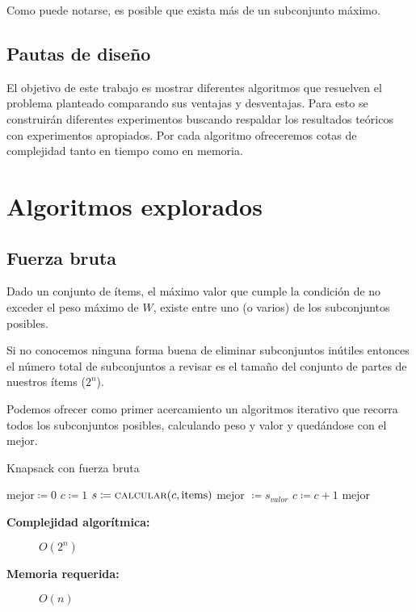 \documentclass[fleqn, 11pt]{article}
\def\is{\coloneqq}
\begin{document}
Como puede notarse, es posible que exista más de un subconjunto máximo.

\subsection{Pautas de diseño}

El objetivo de este trabajo es mostrar diferentes algoritmos que resuelven el
problema planteado comparando sus ventajas y desventajas. Para esto se
construirán diferentes experimentos buscando respaldar los resultados teóricos
con experimentos apropiados. Por cada algoritmo ofreceremos cotas de
complejidad tanto en tiempo como en memoria.

\section{Algoritmos explorados}

\subsection{Fuerza bruta}

Dado un conjunto de ítems, el máximo valor que cumple la condición de no
exceder el peso máximo de $W$, existe entre uno (o varios) de los subconjuntos
posibles.

Si no conocemos ninguna forma buena de eliminar subconjuntos inútiles entonces
el número total de subconjuntos a revisar es el tamaño del conjunto de partes
de nuestros ítems ($2^n$).

Podemos ofrecer como primer acercamiento un algoritmos iterativo que recorra
todos los subconjuntos posibles, calculando peso y valor y quedándose con el
mejor.

\begin{algorithm}
\caption{Knapsack con fuerza bruta}
\begin{algorithmic}[1]
\Statex
{}
\State $\text{mejor} \is 0$
\State $c \is 1$
	\State $s \is \Call{calcular}{c, \text{items}}$
		\State mejor $\is s_{valor}$
	\EndIf
	\State $c \is c + 1$
\EndWhile
\State \Return mejor
\EndFunction
\end{algorithmic}
\begin{description}
	\item[\textbf{Complejidad algorítmica:}] $O(2^n)$
	\item[\textbf{Memoria requerida:}] $O(n)$
\end{description}
\end{algorithm}
\end{document}
